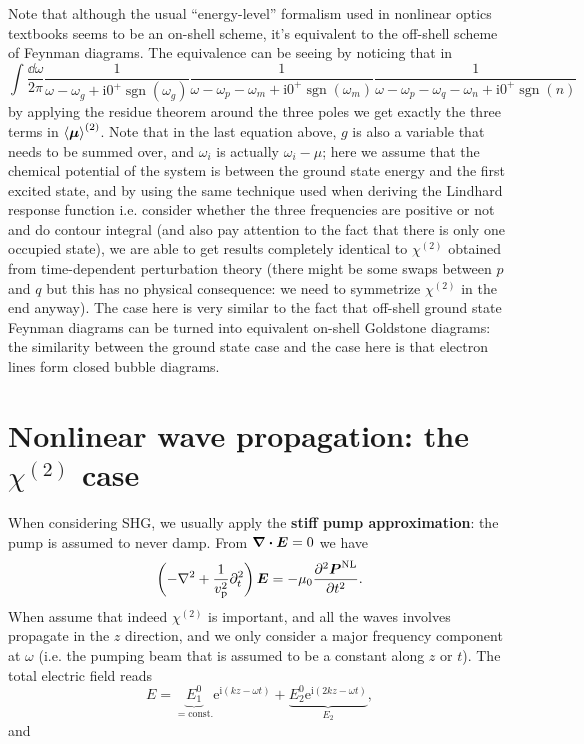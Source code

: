 \documentclass[hyperref, a4paper]{article}
\DeclareMathOperator{\sgn}{sgn}
\newcommand*{\ii}{\mathrm{i}}
\newcommand*{\ee}{\mathrm{e}}
\newcommand*{\const}{\mathrm{const}}
\newcommand*{\concept}[1]{{\textbf{#1}}}
\newcommand*{\vp}{v_{\text{p}}}
\newcommand*{\chitwo}{\chi^{(2)}}
\begin{document}
Note that although the usual ``energy-level'' formalism 
used in nonlinear optics textbooks 
seems to be an on-shell scheme, 
it's equivalent to the off-shell scheme of Feynman diagrams.
The equivalence can be seeing by noticing that in 
\begin{equation}
    \int \frac{\dd{\omega}}{2\pi} \frac{1}{\omega - \omega_g + \ii 0^+ \sgn(\omega_g)} \frac{1}{\omega - \omega_p - \omega_m + \ii 0^+ \sgn(\omega_m)} \frac{1}{\omega - \omega_p - \omega_q - \omega_n + \ii 0^+ \sgn(n)} 
\end{equation}
by applying the residue theorem around the three poles 
we get exactly the three terms in $\expval{\vb*{\mu}}^{(2)}$.
Note that in the last equation above, 
$g$ is also a variable that needs to be summed over, 
and $\omega_i$ is actually $\omega_i - \mu$; 
here we assume that the chemical potential of the system is between 
the ground state energy and the first excited state, 
and by using the same technique used when deriving the Lindhard response function
i.e. consider whether the three frequencies are positive or not 
and do contour integral (and also pay attention to the fact that there is only one occupied state),
we are able to get results completely identical to 
$\chi^{(2)}$ obtained from time-dependent perturbation theory 
(there might be some swaps between $p$ and $q$ 
but this has no physical consequence: 
we need to symmetrize $\chi^{(2)}$ in the end anyway).
The case here is very similar to the fact that 
off-shell ground state Feynman diagrams can be turned into equivalent 
on-shell Goldstone diagrams:
the similarity between the ground state case and the case here 
is that electron lines form closed bubble diagrams.

\section{Nonlinear wave propagation: the $\chitwo$ case}

When considering SHG, we usually apply the \concept{stiff pump approximation}: 
the pump is assumed to never damp.
From $\div{\vb*{E}} = 0$ we have 
\begin{equation}
    \left(
        - \laplacian + \frac{1}{\vp^2} \partial_t^2 
    \right) \vb*{E} = - \mu_0 \pdv[2]{\vb*{P}^{\text{NL}}}{t}.
\end{equation}
When assume that indeed $\chitwo$ is important, 
and all the waves involves propagate in the $z$ direction,
and we only consider a major frequency component at $\omega$
(i.e. the pumping beam that is assumed to be a constant along $z$ or $t$).
The total electric field reads 
\begin{equation}
    E = \underbrace{E_1^0}_{= \const.} \ee^{\ii (kz - \omega t)}
    + \underbrace{E_2^0 \ee^{\ii (2 k z - \omega t)}}_{E_2},
\end{equation}
and 
\end{document}
